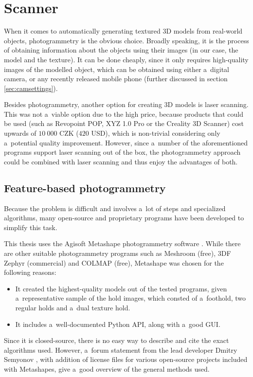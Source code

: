 \chapter{Scanner}\label{sec:scanner}
When it comes to automatically generating textured 3D models from real-world objects, photogrammetry is the obvious choice.
Broadly speaking, it is the process of obtaining information about the objects using their images (in our case, the model and the texture).
It can be done cheaply, since it only requires high-quality images of the modelled object, which can be obtained using either a~digital camera, or any recently released mobile phone (further discussed in section \ref{sec:camsettings}).

Besides photogrammetry, another option for creating 3D models is laser scanning.
This was not a~viable option due to the high price, because products that could be used (such as Revopoint POP, XYZ 1.0 Pro or the Creality 3D Scanner) cost upwards of $10\ 000$ CZK ($420$ USD), which is non-trivial considering only a~potential quality improvement.
However, since a~number of the aforementioned programs support laser scanning out of the box, the photogrammetry approach could be combined with laser scanning and thus enjoy the advantages of both.

\section{Feature-based photogrammetry}
Because the problem is difficult and involves a~lot of steps and specialized algorithms, many open-source and proprietary programs have been developed to simplify this task.

This thesis uses the Agisoft Metashape photogrammetry software \cite{metashape}.
While there are other suitable photogrammetry programs such as Meshroom (free), 3DF Zephyr (commercial) and COLMAP (free), Metashape was chosen for the following reasons:
\begin{itemize}
	\item It created the highest-quality models out of the tested programs, given a~representative sample of the hold images, which consted of a~foothold, two regular holds and a~dual texture hold.
	\item It includes a~well-documented Python API, along with a~good GUI.
\end{itemize}

Since it is closed-source, there is no easy way to describe and cite the exact algorithms used.
However, a~forum statement from the lead developer Dmitry Semyonov \parencite{metashapeForumPost}, with addition of license files for various open-source projects included with Metashapes, give a~good overview of the general methods used.

